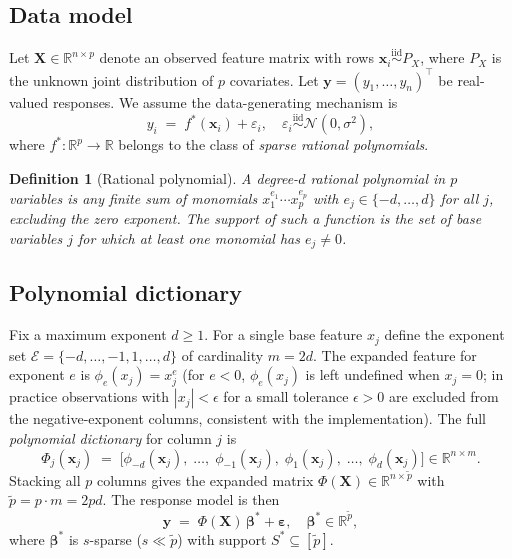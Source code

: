 \documentclass[11pt, a4paper]{article}
\newtheorem{definition}{Definition}
\newcommand{\R}{\mathbb{R}}
\newcommand{\N}{\mathcal{N}}
\newcommand{\calE}{\mathcal{E}}
\newcommand{\Xb}{\mathbf{X}}
\newcommand{\xb}{\mathbf{x}}
\newcommand{\yb}{\mathbf{y}}
\newcommand{\betab}{\boldsymbol{\beta}}
\begin{document}
\subsection{Data model}

Let $\Xb \in \R^{n \times p}$ denote an observed feature matrix with rows
$\xb_i \stackrel{\mathrm{iid}}{\sim} P_X$, where $P_X$ is the unknown joint
distribution of $p$ covariates.  Let $\yb = (y_1, \ldots, y_n)^\top$ be
real-valued responses.  We assume the data-generating mechanism is
\begin{equation}
  y_i \;=\; f^*(\xb_i) + \varepsilon_i,
  \quad \varepsilon_i \stackrel{\mathrm{iid}}{\sim} \N(0, \sigma^2),
  \label{eq:dgp}
\end{equation}
where $f^*: \R^p \to \R$ belongs to the class of \emph{sparse rational
polynomials}.

\begin{definition}[Rational polynomial]
A \emph{degree-$d$ rational polynomial} in $p$ variables is any finite sum
of monomials $x_1^{e_1} \cdots x_p^{e_p}$ with $e_j \in \{-d, \ldots, d\}$
for all $j$, excluding the zero exponent.  The \emph{support} of such a
function is the set of base variables $j$ for which at least one monomial
has $e_j \neq 0$.
\end{definition}

\subsection{Polynomial dictionary}

Fix a maximum exponent $d \geq 1$.  For a single base feature $x_j$ define
the exponent set $\calE = \{-d, \ldots, -1, 1, \ldots, d\}$ of cardinality
$m = 2d$.  The expanded feature for exponent $e$ is $\phi_e(x_j) = x_j^e$
(for $e < 0$, $\phi_e(x_j)$ is left undefined when $x_j = 0$;
in practice observations with $|x_j| < \epsilon$ for a small tolerance
$\epsilon > 0$ are excluded from the negative-exponent columns,
consistent with the implementation).  The
full \emph{polynomial dictionary} for column $j$ is
\[
  \Phi_j(\xb_j) \;=\;
  \bigl[\phi_{-d}(\xb_j),\; \ldots,\; \phi_{-1}(\xb_j),\;
         \phi_1(\xb_j),\; \ldots,\; \phi_d(\xb_j)\bigr]
  \in \R^{n \times m}.
\]
Stacking all $p$ columns gives the expanded matrix
$\Phi(\Xb) \in \R^{n \times \tilde p}$ with $\tilde p = p \cdot m = 2pd$.
The response model is then
\begin{equation}
  \yb \;=\; \Phi(\Xb)\,\betab^* + \boldsymbol{\varepsilon},
  \quad \betab^* \in \R^{\tilde p},
  \label{eq:linear_model}
\end{equation}
where $\betab^*$ is $s$-sparse ($s \ll \tilde p$) with support
$S^* \subseteq [\tilde p]$.
\end{document}
